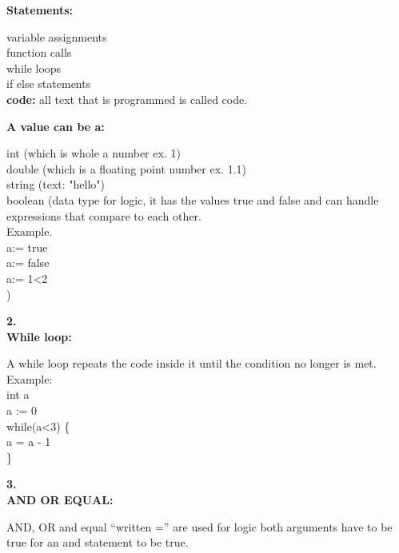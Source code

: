 \begin{flushleft}
\textbf{Statements:}
\end{flushleft}
  \hspace*{3mm} variable assignments\\
  \hspace*{3mm} function calls\\
  \hspace*{3mm} while loops\\
  \hspace*{3mm} if else statements\\
\textbf{code:} all text that is programmed is called code.\\
\begin{flushleft}
\textbf{A value can be a:}\\
\end{flushleft}
int (which is whole a number ex. 1)\\
double (which is a floating point number ex. 1.1)\\
string (text: "hello")\\
boolean (data type for logic, it has the values true and false and can handle expressions that compare to each other.\\
\hspace*{13mm} Example. \\
\hspace*{13mm} a:= true\\ 
\hspace*{13mm} a:= false\\
\hspace*{13mm} a:= 1<2\\
)
\begin{flushleft}
\textbf{2.}\\
\textbf{While loop:}
\end{flushleft}
A while loop repeats the code inside it until the condition no longer is met.\\
Example:\\
int a\\
a := 0\\
while(a<3) \{\\
\hspace*{2mm} a = a - 1\\
\}	
\begin{flushleft}
\textbf{3.}\\
\textbf{AND OR EQUAL:}
\end{flushleft}
AND, OR  and equal “written =” are used for logic
both arguments have to be true for an and statement to be true.

